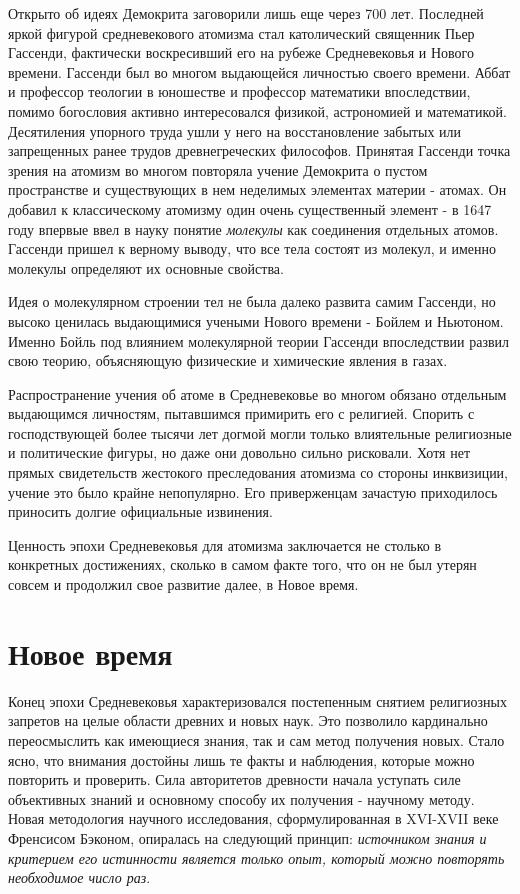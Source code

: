 Открыто об идеях Демокрита заговорили лишь еще через 700 лет.
Последней яркой фигурой средневекового атомизма стал католический священник Пьер Гассенди, фактически воскресивший его на рубеже Средневековья и Нового времени.
Гассенди был во многом выдающейся личностью своего времени. 
Аббат и профессор теологии в юношестве и профессор математики впоследствии, помимо богословия активно интересовался физикой, астрономией и математикой. 
Десятиления упорного труда ушли у него на восстановление забытых или запрещенных ранее трудов древнегреческих философов. 
Принятая Гассенди точка зрения на атомизм во многом повторяла учение Демокрита о пустом пространстве и существующих в нем неделимых элементах материи - атомах. 
Он добавил к классическому атомизму один очень существенный элемент - в 1647 году впервые ввел в науку понятие \textit{молекулы} как соединения отдельных атомов. 
Гассенди пришел к верному выводу, что все тела состоят из молекул, и именно молекулы определяют их основные свойства.

Идея о молекулярном строении тел не была далеко развита самим Гассенди, но высоко ценилась выдающимися учеными Нового времени - Бойлем и Ньютоном.
Именно Бойль под влиянием молекулярной теории Гассенди впоследствии развил свою теорию, объясняющую физические и химические явления в газах.    

Распространение учения об атоме в Средневековье во многом обязано отдельным выдающимся личностям, пытавшимся примирить его с религией.
Спорить с господствующей более тысячи лет догмой могли только влиятельные религиозные и политические фигуры, но даже они довольно сильно рисковали.
Хотя нет прямых свидетельств жестокого преследования атомизма со стороны инквизиции, учение это было крайне непопулярно.
Его приверженцам зачастую приходилось приносить долгие официальные извинения.

Ценность эпохи Средневековья для атомизма заключается не столько в конкретных достижениях, сколько в самом факте того, что он не был утерян совсем и продолжил свое развитие далее, в Новое время.


\section*{Новое время}

Конец эпохи Средневековья характеризовался постепенным снятием религиозных запретов на целые области древних и новых наук. 
Это позволило кардинально переосмыслить как имеющиеся знания, так и сам метод получения новых.
Стало ясно, что внимания достойны лишь те факты и наблюдения, которые можно повторить и проверить.
Сила авторитетов древности начала уступать силе объективных знаний и основному способу их получения - научному методу.
Новая методология научного исследования, сформулированная в XVI-XVII веке Френсисом Бэконом, опиралась на следующий принцип: \textit{источником знания и критерием его истинности является только опыт, который можно повторять необходимое число раз}.

